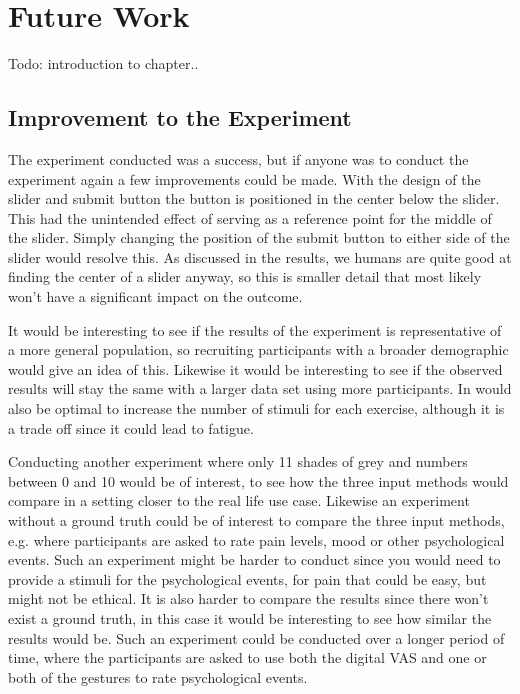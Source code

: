 \chapter{Future Work}\label{future_ch}

Todo: introduction to chapter.. 

\section{Improvement to the Experiment}
The experiment conducted was a success, but if anyone was to conduct the experiment again a few improvements could be made. With the design of the slider and submit button the button is positioned in the center below the slider. This had the unintended effect of serving as a reference point for the middle of the slider. Simply changing the position of the submit button to either side of the slider would resolve this. As discussed in the results, we humans are quite good at finding the center of a slider anyway, so this is smaller detail that most likely won't have a significant impact on the outcome.

It would be interesting to see if the results of the experiment is representative of a more general population, so recruiting participants with a broader demographic would give an idea of this. Likewise it would be interesting to see if the observed results will stay the same with a larger data set using more participants. In would also be optimal to increase the number of stimuli for each exercise, although it is a trade off since it could lead to fatigue.

Conducting another experiment where only 11 shades of grey and numbers between 0 and 10 would be of interest, to see how the three input methods would compare in a setting closer to the real life use case. Likewise an experiment without a ground truth could be of interest to compare the three input methods, e.g. where participants are asked to rate pain levels, mood or other psychological events. Such an experiment might be harder to conduct since you would need to provide a stimuli for the psychological events, for pain that could be easy, but might not be ethical. It is also harder to compare the results since there won't exist a ground truth, in this case it would be interesting to see how similar the results would be. Such an experiment could be conducted over a longer period of time, where the participants are asked to use both the digital VAS and one or both of the gestures to rate psychological events.

